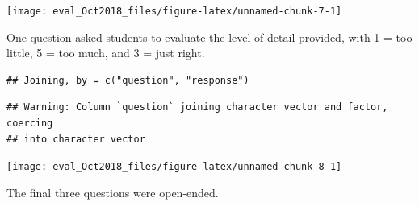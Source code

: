 \documentclass[]{article}
\begin{document}
\begin{center}\texttt{[image: eval\_Oct2018\_files/figure-latex/unnamed-chunk-7-1]} \end{center}

One question asked students to evaluate the level of detail provided,
with 1 = too little, 5 = too much, and 3 = just right.

\begin{verbatim}
## Joining, by = c("question", "response")
\end{verbatim}

\begin{verbatim}
## Warning: Column `question` joining character vector and factor, coercing
## into character vector
\end{verbatim}

\begin{center}\texttt{[image: eval\_Oct2018\_files/figure-latex/unnamed-chunk-8-1]} \end{center}

The final three questions were open-ended.
\end{document}
